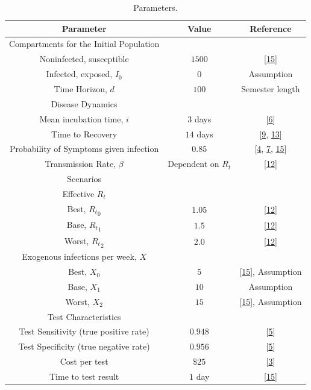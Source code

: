 \documentclass[fullpage]{extarticle}
\begin{document}
\begin{table}[p!]
\begin{Large}
\begin{center}
\begin{tabular}{|c||c|c|}\hline
Parameter 							& Value		& Reference			\\ \hline\hline
Compartments for the Initial Population	&			&					\\ \hline
Noninfected, susceptible 				& $1500$	& [\hyperref[ref:15]{15}]	\\ \hline
Infected, exposed, $I_{0}$			& $0$		& Assumption		\\ \hline
Time Horizon, $d$					& $100$		& Semester length	\\ \hline\hline
Disease Dynamics						&			&				\\ \hline
Mean incubation time, $i$				& $3$ days	& [\hyperref[ref:6]{6}] \\ \hline
Time to Recovery		& $14$ days	& [\hyperref[ref:9]{9}, \hyperref[ref:13]{13}]	\\ \hline
Probability of Symptoms given infection	& $0.85$	& [\hyperref[ref:4]{4}, \hyperref[ref:7]{7}, \hyperref[ref:15]{15}]	\\ \hline
Transmission Rate, $\beta$			& Dependent on $R_{t}$	& [\hyperref[ref:12]{12}]	\\ \hline\hline 
Scenarios							&			&\\ \hline
Effective $R_{t}$						&			&							\\ \hline
Best,	${R_{t}}_{0}$						& $1.05$	& [\hyperref[ref:12]{12}]		\\ \hline
Base, ${R_{t}}_{1}$					& $1.5$		& [\hyperref[ref:12]{12}]		\\ \hline
Worst, ${R_{t}}_{2}$					& $2.0$		& [\hyperref[ref:12]{12}]		\\ \hline
Exogenous infections per week,	$X$		&			&					\\ \hline
Best,	$X_{0}$						& $5$		& [\hyperref[ref:15]{15}], Assumption		\\ \hline
Base, $X_{1}$						& $10$		& Assumption		\\ \hline
Worst, $X_{2}$						& $15$		& [\hyperref[ref:15]{15}], Assumption\\ \hline\hline
Test Characteristics					&			&					\\ \hline
Test Sensitivity (true positive rate)	& $0.948$	& [\hyperref[ref:5]{5}] \\ \hline
Test Specificity (true negative rate)	& $0.956$	& [\hyperref[ref:5]{5}] \\ \hline
Cost per test							& $\$25$	& [\hyperref[ref:3]{3}]	\\ \hline
Time to test result			& $1$ day	& [\hyperref[ref:15]{15}]		\\ \hline

\end{tabular}
\caption{\label{table:parameters}Parameters.}
\end{center}
\end{Large}
\end{table}
\end{document}
